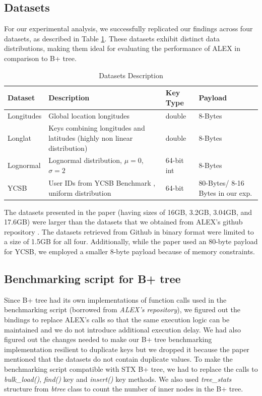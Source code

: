 \documentclass[12pt,a4paper]{article}
\begin{document}
\subsection{Datasets}
For our experimental analysis, we successfully replicated our findings across four datasets, as described in Table \ref{tab:datasets}. These datasets exhibit distinct data distributions, making them ideal for evaluating the performance of ALEX in comparison to B+ tree.
\begin{table}[h]
    \centering
        \caption{Datasets Description}
    \begin{tabular}{|l|p{9cm}|l|p{2cm}|}
        \hline
        \textbf{Dataset} & \textbf{Description} & \textbf{Key Type} & \textbf{Payload} \\
        \hline
        Longitudes & Global location longitudes \cite{osm_aws} & double & 8-Bytes \\
        \hline
        Longlat &  Keys combining longitudes and latitudes (highly non linear distribution) & double & 8-Bytes \\
        \hline
        Lognormal & Lognormal distribution, $\mu=0$, $\sigma=2$ & 64-bit int & 8-Bytes \\
        \hline
        YCSB & User IDs from YCSB Benchmark \cite{cooper2010benchmarking}, uniform distribution & 64-bit & 80-Bytes/ 8-16 Bytes in our exp. \\
        
        \hline
    \end{tabular}

    \label{tab:datasets}
\end{table}
The datasets presented in the paper \cite{ding2020alex} (having sizes of 16GB, 3.2GB, 3.04GB, and 17.6GB) were larger than the datasets that we obtained from ALEX's github repository \cite{alex_repo}. The datasets retrieved from Github in binary format were limited to a size of 1.5GB for all four. Additionally, while the paper used an 80-byte payload for YCSB, we employed a smaller 8-byte payload because of memory constraints.

\subsection{Benchmarking script for B+ tree}
Since B+ tree had its own implementations of function calls used in the benchmarking script (borrowed from \emph{ALEX’s repository}), we figured out the bindings to replace ALEX’s  calls so that the same execution logic can be maintained and we do not introduce additional execution delay. We had also figured out the changes needed to make our B+ tree benchmarking implementation resilient to duplicate keys but we dropped it because the paper mentioned that the datasets do not contain duplicate values. To make the benchmarking script compatible with STX B+ tree, we had to replace the calls to \emph{bulk\_load()}, \emph{find()} key and \emph{insert()} key methods. We also used \emph{tree\_stats} structure from \emph{btree} class to count the number of inner nodes in the B+ tree. 
\end{document}
